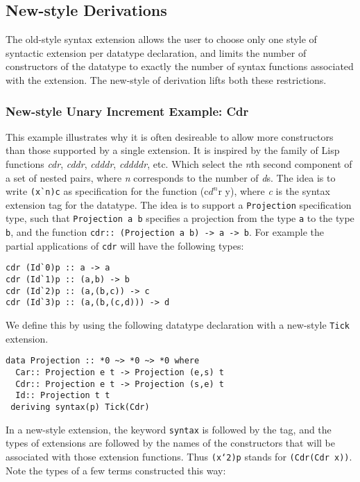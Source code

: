 \documentclass[11pt,twoside]{article}
\begin{document}
\subsection{New-style Derivations}

The old-style syntax extension allows the user to choose only one style of syntactic extension
per datatype declaration, and limits the number of constructors of the datatype to exactly the number
of syntax functions associated with the extension. The new-style of derivation lifts both these restrictions.

\subsubsection{New-style Unary Increment Example: Cdr}

This example illustrates why it is often desireable to allow more constructors than those supported by a
single extension. It is inspired by the family of Lisp functions {\it cdr}, {\it cddr}, {\it cdddr}, {\it
cddddr}, etc. Which select the {\it n}th second component of a set of nested pairs, where {\it n}
corresponds to the number of {\it d}s. The idea is to write \verb+(x`n)c+ as specification
for the function (c$d^n$r y), where {\it c}
is the syntax extension tag for the datatype. The idea is to support a {\tt Projection}
specification type, such that {\tt Projection a b} specifies a projection from the type {\tt a}
to the type {\tt b}, and the function {\tt cdr:: (Projection a b) -> a -> b}. For
example the partial applications of {\tt cdr} will have the following types:

\begin{verbatim}
cdr (Id`0)p :: a -> a
cdr (Id`1)p :: (a,b) -> b
cdr (Id`2)p :: (a,(b,c)) -> c
cdr (Id`3)p :: (a,(b,(c,d))) -> d
\end{verbatim}

We define this by using the following datatype declaration with a new-style {\tt Tick}
extension.

\begin{verbatim}
data Projection :: *0 ~> *0 ~> *0 where
  Car:: Projection e t -> Projection (e,s) t
  Cdr:: Projection e t -> Projection (s,e) t
  Id:: Projection t t
 deriving syntax(p) Tick(Cdr) 
\end{verbatim} 

In a new-style extension, the keyword {\tt syntax} is followed by the tag, and the
types of extensions are followed by the names of the constructors that will be associated
with those extension functions. Thus {\tt (x`2)p} stands for {\tt (Cdr(Cdr x))}.
Note the types of a few terms constructed this way:
\end{document}
